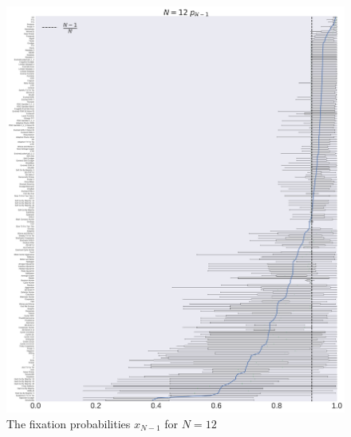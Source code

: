 \documentclass[10pt,letterpaper]{article}
\begin{document}
\begin{figure}[!hbtp]
    \centering
    \includegraphics[width=\textwidth]{./boxplot_12_resist.pdf}
    \caption{The fixation probabilities \(x_{N-1}\) for \(N=12\)}
\end{figure}
\end{document}
